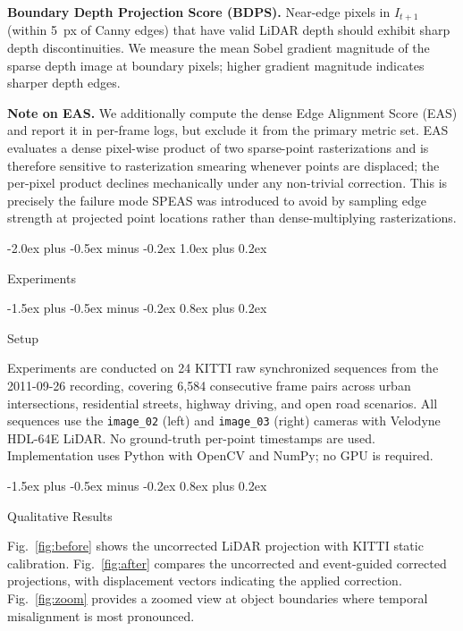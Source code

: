 \documentclass[conference]{IEEEtran}
\makeatletter
\def\section{\@startsection{section}{1}{\z@}
  {-2.0ex plus -0.5ex minus -0.2ex}
  {1.0ex plus 0.2ex}
  {\normalfont\large\bfseries\raggedright}}
\def\subsection{\@startsection{subsection}{2}{\z@}
  {-1.5ex plus -0.5ex minus -0.2ex}
  {0.8ex plus 0.2ex}
  {\normalfont\normalsize\bfseries\raggedright}}
\makeatother
\begin{document}
\textbf{Boundary Depth Projection Score (BDPS).}
Near-edge pixels in $I_{t+1}$ (within 5~px of Canny edges) that
have valid LiDAR depth should exhibit sharp depth
discontinuities. We measure the mean Sobel gradient magnitude of
the sparse depth image at boundary pixels; higher gradient
magnitude indicates sharper depth edges.

\textbf{Note on EAS.}
We additionally compute the dense Edge Alignment Score (EAS) and
report it in per-frame logs, but exclude it from the primary
metric set. EAS evaluates a dense pixel-wise product of two
sparse-point rasterizations and is therefore sensitive to
rasterization smearing whenever points are displaced; the
per-pixel product declines mechanically under any non-trivial
correction. This is precisely the failure mode SPEAS was
introduced to avoid by sampling edge strength at projected
point locations rather than dense-multiplying rasterizations.

\section{Experiments}
\label{sec:experiments}

\subsection{Setup}

Experiments are conducted on 24 KITTI raw synchronized sequences
from the 2011-09-26 recording, covering 6{,}584 consecutive
frame pairs across urban intersections, residential streets,
highway driving, and open road scenarios. All sequences use
the \texttt{image\_02} (left) and \texttt{image\_03} (right)
cameras with Velodyne HDL-64E LiDAR. No ground-truth per-point
timestamps are used. Implementation uses Python with OpenCV and
NumPy; no GPU is required.

\subsection{Qualitative Results}

Fig.~\ref{fig:before} shows the uncorrected LiDAR projection
with KITTI static calibration. Fig.~\ref{fig:after} compares
the uncorrected and event-guided corrected projections, with
displacement vectors indicating the applied correction.
Fig.~\ref{fig:zoom} provides a zoomed view at object
boundaries where temporal misalignment is most pronounced.
\end{document}
